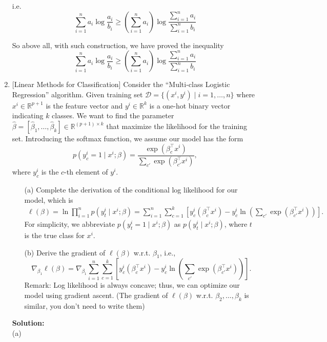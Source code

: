 \documentclass[10pt]{article}
\begin{document}
\begin{enumerate}[1.]
		  i.e. $$\sum\limits_{i=1}^{n} a_i \log \frac{a_i}{b_i} \geq \left( \sum_{i=1}^{n} a_i\right) \log \frac{\sum_{i=1}^{n} a_i}{\sum_{i=1}^{n} b_i}$$

		  So above all, with such construction, we have proved the inequality
		  $$\sum_{i=1}^{n} a_i \log \frac{a_i}{b_i} \geq \left( \sum_{i=1}^{n} a_i\right) \log \frac{\sum_{i=1}^{n} a_i}{\sum_{i=1}^{n} b_i}$$

	      \newpage

	\item {} [Linear Methods for Classification] 
	Consider the ``Multi-class Logistic Regression'' algorithm. Given training set 
	$\mathcal{D}=\{(x^i,y^i)\mid i=1,\ldots,n\}$ where $x^i\in \mathbb{R}^{p+1}$ is the 
	feature vector and $y^i\in \mathbb{R}^{k}$ is a one-hot binary vector indicating 
	$k$ classes. We want to find the parameter $\hat{\beta}=[\hat{\beta}_1,\ldots,\hat{\beta}_k]\in \mathbb{R}^{(p+1)\times k}$ 
	that maximize the likelihood for the training set. Introducing the softmax 
	function, we assume our model has the form 
	\[
		p(y_c^i=1\mid x^i;\beta) = \frac{\exp(\beta_c^\top x^i)}{\sum_{c'}\exp(\beta_{c'}^\top x^i)},
	\]
	where $y_c^i$ is the $c$-th element of $y^i$.
		  \begin{itemize}
			\item[(a)] Complete the derivation of the conditional log likelihood for our model, which is
			\begin{align*}
				\ell(\beta) = \ln \prod_{i=1}^{n} p(y_t^i\mid x^i;\beta)
				=\sum_{i=1}^{n}\sum_{c=1}^{k}\left[ y_c^i(\beta_c^\top x^i) - y_c^i\ln \left(\sum_{c'}\exp(\beta_{c'}^\top x^i) \right)\right].
			\end{align*}
			For simplicity, we abbreviate $p(y_t^i=1\mid x^i;\beta)$ as $p(y_t^i\mid x^i;\beta)$, where 
			$t$ is the true class for $x^i$.~
			\item[(b)] Derive the gradient of $\ell(\beta)$ w.r.t. $\beta_1$, i.e., 
			\[
				\nabla_{\beta_1}\ell(\beta) = \nabla_{\beta_1} \sum_{i=1}^{n}\sum_{c=1}^{k}\left[ y_c^i(\beta_c^\top x^i) - y_c^i\ln \left(\sum_{c'}\exp(\beta_{c'}^\top x^i) \right)\right].
			\]
			Remark: Log likelihood is always concave; thus, we can optimize our model 
			using gradient ascent. (The gradient of $\ell(\beta)$ w.r.t. $\beta_2,\ldots,\beta_k$ is similar, you don't need to write them)~
		  \end{itemize}
		  \textbf{Solution:}\\
		  (a) 







\end{enumerate}
\end{document}
